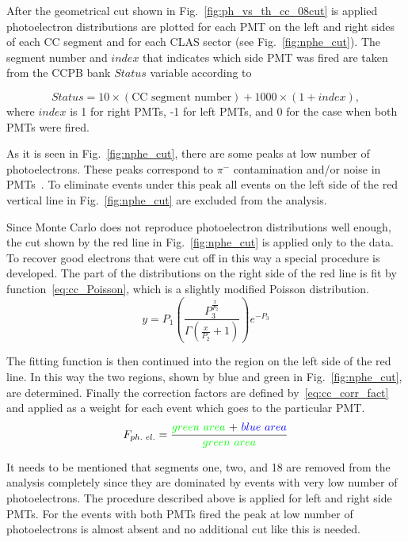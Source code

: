 After the geometrical cut shown in Fig.~\ref{fig:ph_vs_th_cc_08cut} is applied photoelectron distributions are plotted for each PMT on the left and right sides of each CC segment and for each CLAS sector (see Fig.~\ref{fig:nphe_cut}). The segment number and $index$ that indicates which side PMT was fired are taken from the  CCPB bank $Status$ variable according to

\begin{equation}
Status = 10\times(\text{CC segment number}) + 1000\times( 1 + index),
\label{eq:cc_segment}
\end{equation}
where $index$ is 1 for right PMTs, -1 for left PMTs, and 0 for the case when both PMTs were fired.

As it is seen in Fig.~\ref{fig:nphe_cut}, there are some peaks at low number of photoelectrons. These peaks correspond to $\pi^{-}$ contamination and/or noise in PMTs~\cite{Osipenko:2004}. To eliminate events under this peak all events on the left side of the red vertical line in Fig.~\ref{fig:nphe_cut} are excluded from the analysis.

Since Monte Carlo does not reproduce photoelectron distributions well enough, the cut shown by the red line in Fig.~\ref{fig:nphe_cut} is applied only to the data. To recover good electrons that were cut off in this way a special procedure is developed. The part of the distributions on the right side of the red line is fit by function~\ref{eq:cc_Poisson}, which is a slightly modified Poisson distribution. 
\begin{equation}
y = P_{1}\left(\frac{P_{3}^{\frac{x}{P_{2}}}}{\Gamma\left(\frac{x}{P_{2}}+1\right)}
\right)e^{-P_{3}}
\label{eq:cc_Poisson}
\end{equation}

The fitting function is then continued into the region on the left side of the red line. In this way the two regions, shown by blue and green in Fig.~\ref{fig:nphe_cut}, are determined. Finally the correction factors are defined by~\ref{eq:cc_corr_fact} and applied as a weight for each event which goes to the particular PMT.
\begin{equation}
F_{ph.\,\, el.} = \frac{\color{green}{green\,\,  area} \color{black}{\,\,+\,\,} \color{blue}{blue\,\,  area}}{\color{green}{green\,\,  area}}
\label{eq:cc_corr_fact}
\end{equation}

It needs to be mentioned that segments one, two, and 18 are removed from the analysis completely since they are dominated by events with very low number of photoelectrons. The procedure described above is applied for left and right side PMTs. For the events with both PMTs fired the peak at low number of photoelectrons is almost absent and no additional cut like this is needed.

